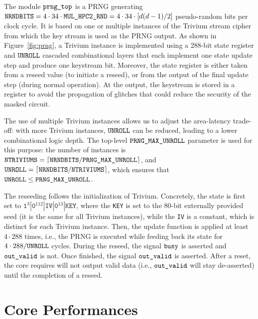 \documentclass{scrartcl}
\begin{document}
\label{subsection:PRNG}

The module $\texttt{prng\_top}$ is a PRNG generating $\texttt{NRNDBITS} = 4\cdot 34 \cdot \texttt{MUL\_HPC2\_RND}
 = 4\cdot 34 \cdot [d(d-1)/2]$ pseudo-random bits per clock cycle.  It is based on
one or multiple instances of the Trivium stream
cipher~\cite{DBLP:series/lncs/CanniereP08} from which the key stream is used as
the PRNG output.  As shown in Figure~\ref{fig:prng}, a Trivium instance is
implemented using a 288-bit state register and $\texttt{UNROLL}$ cascaded combinational
layers that each implement one state update step and produce one keystream bit.
Moreover, the state register is either taken from a reseed value (to initiate a
reseed), or from the output of the final update step (during normal operation).
At the output, the keystream is stored in a register to avoid the propagation
of glitches that could reduce the security of the masked circuit.

The use of multiple Trivium instances allows us to adjust the area-latency
trade-off: with more Trivium instances, $\texttt{UNROLL}$ can be reduced, leading to a
lower combinational logic depth.  The top-level $\texttt{PRNG\_MAX\_UNROLL}$ parameter is used
for this purpose: the number of instances is $\texttt{NTRIVIUMS} = \lceil \texttt{NRNDBITS} /
\texttt{PRNG\_MAX\_UNROLL} \rceil$, and $\texttt{UNROLL} = \lceil \texttt{NRNDBITS} / \texttt{NTRIVIUMS} \rceil$, which
ensures that $\texttt{UNROLL} \le \texttt{PRNG\_MAX\_UNROLL}$.

The reseeding follows the initialization of Trivium. Concretely, the state is
first set to
$\texttt{1}^3|\texttt{0}^{112}|\texttt{IV}|\texttt{0}^{13}|\texttt{KEY}$, where
the \texttt{KEY} is set to the 80-bit externally provided seed (it is
the same for all Trivium instances), while the \texttt{IV} is a constant, which
is distinct for each Trivium instance.  Then, the update function is applied at
least $4\cdot 288$ times, i.e., the PRNG is executed while feeding back its
state for $4\cdot 288 / \texttt{UNROLL}$ cycles.  During the reseed, the signal
$\texttt{busy}$ is asserted and $\texttt{out\_valid}$ is not. Once finished, the
signal $\texttt{out\_valid}$ is asserted.  After a reset, the core requires will
not output valid data (i.e., $\texttt{out\_valid}$ will stay de-asserted) until
the completion of a reseed.
  
\section{Core Performances}
\end{document}
